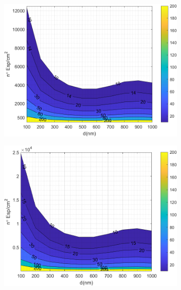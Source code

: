\begin{figure}[H]
	\centering
	\begin{subfigure}[b]{0.49\textwidth}
		\centering
			\includegraphics[width=1.00\textwidth]{figuras/Resultados/RelacionCondRad/SS_Rc_Intermedio.png}
		\caption{ }
		\label{fig:rel_SsSiO2Ge_Rc_inter}
	\end{subfigure}
	\hfill	
	\begin{subfigure}[b]{0.49\textwidth}
		\centering
			\includegraphics[width=1.00\textwidth]{figuras/Resultados/RelacionCondRad/SS_Rc.png}
		\caption{ }
		\label{fig:rel_SsSiO2Ge_Rc_max}
	\end{subfigure}

\end{figure}
